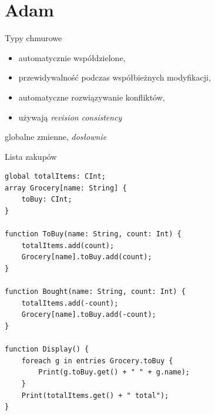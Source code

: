\documentclass{beamer}
\begin{document}
\section{Adam}

\begin{frame}[fragile]{Typy chmurowe}
    \begin{card}
        \begin{itemize}[<+->]
            \item automatycznie współdzielone,
            \item przewidywalność podczas współbieżnych modyfikacji,
            \item automatyczne rozwiązywanie konfliktów,
            \item używają \textit{revision consistency}
        \end{itemize}
    \end{card}
     {
        \begin{card}
            globalne zmienne, \textit{dosłownie}
        \end{card}
    }
\end{frame}

\begin{frame}[fragile]{Lista zakupów}
    \begin{card}
        \begin{lstlisting}
global totalItems: CInt;
array Grocery[name: String] {
    toBuy: CInt;
}

function ToBuy(name: String, count: Int) {
    totalItems.add(count);
    Grocery[name].toBuy.add(count);
}

function Bought(name: String, count: Int) {
    totalItems.add(-count);
    Grocery[name].toBuy.add(-count);
}

function Display() {
    foreach g in entries Grocery.toBuy {
        Print(g.toBuy.get() + " " + g.name);
    }
    Print(totalItems.get() + " total");
}
        \end{lstlisting}
    \end{card}
\end{frame}
\end{document}
